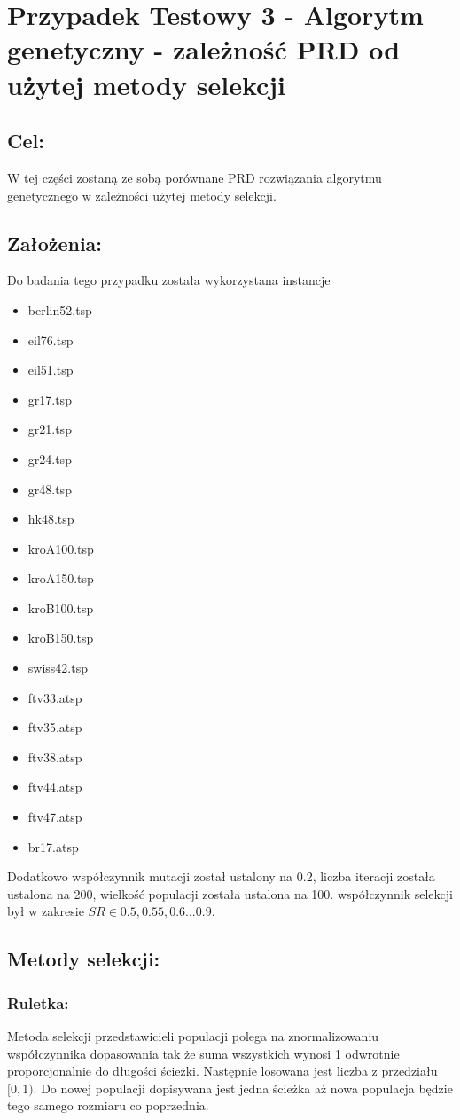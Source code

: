 \section{Przypadek Testowy 3 - Algorytm genetyczny - zależność PRD od użytej metody selekcji}
  \subsection{Cel:}
    W tej części zostaną ze sobą porównane PRD rozwiązania algorytmu genetycznego w zależności użytej metody selekcji.
    \subsection{Założenia:}
    Do badania tego przypadku została wykorzystana instancje 
    \begin{itemize}
      \item berlin52.tsp
      \item eil76.tsp
      \item eil51.tsp
      \item gr17.tsp
      \item gr21.tsp
      \item gr24.tsp
      \item gr48.tsp
      \item hk48.tsp
      \item kroA100.tsp
      \item kroA150.tsp
      \item kroB100.tsp
      \item kroB150.tsp
      \item swiss42.tsp
      \item ftv33.atsp
      \item ftv35.atsp
      \item ftv38.atsp
      \item ftv44.atsp
      \item ftv47.atsp
      \item br17.atsp
    \end{itemize}
    Dodatkowo współczynnik mutacji został ustalony na 0.2, liczba iteracji została ustalona na 200, wielkość populacji została ustalona na 100. współczynnik selekcji był w zakresie \(SR \in {0.5, 0.55, 0.6 ... 0.9}\).
    \subsection{Metody selekcji:}
    \subsubsection{Ruletka:}
    Metoda selekcji przedstawicieli populacji polega na znormalizowaniu współczynnika dopasowania tak że suma wszystkich wynosi 1 odwrotnie proporcjonalnie do długości ścieżki. Następnie losowana jest liczba z przedziału \( [0, 1)\). Do nowej populacji dopisywana jest jedna ścieżka aż nowa populacja będzie tego samego rozmiaru co poprzednia.
